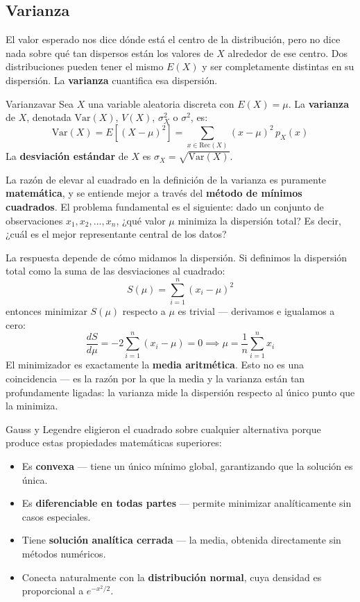 \documentclass[12pt, a4paper]{book}
\numberwithin{equation}{chapter}
\begin{document}
\subsection{Varianza}

El valor esperado nos dice dónde está el centro de la distribución, 
pero no dice nada sobre qué tan dispersos están los valores de $X$ 
alrededor de ese centro. Dos distribuciones pueden tener el mismo 
$E(X)$ y ser completamente distintas en su dispersión. La 
\textbf{varianza} cuantifica esa dispersión.

\begin{definicion}{Varianza}{var}
	Sea $X$ una variable aleatoria discreta con $E(X) = \mu$. La 
	\textbf{varianza} de $X$, denotada $\text{Var}(X)$, $V(X)$, 
	$\sigma^2_X$ o $\sigma^2$, es:
	\[
	\text{Var}(X) = E\!\left[(X - \mu)^2\right] 
	= \sum_{x \in \text{Rec}(X)} (x - \mu)^2\, p_X(x)
	\]
	La \textbf{desviación estándar} de $X$ es $\sigma_X = 
	\sqrt{\text{Var}(X)}$.
\end{definicion}

La razón de elevar al cuadrado en la definición de la varianza es 
puramente \textbf{matemática}, y se entiende mejor a través del 
\textbf{método de mínimos cuadrados}. El problema fundamental es 
el siguiente: dado un conjunto de observaciones $x_1, x_2, \ldots, 
x_n$, ¿qué valor $\mu$ minimiza la dispersión total? Es decir, 
¿cuál es el mejor representante central de los datos?

La respuesta depende de cómo midamos la dispersión. Si definimos 
la dispersión total como la suma de las desviaciones al cuadrado:
\[
S(\mu) = \sum_{i=1}^n (x_i - \mu)^2
\]
entonces minimizar $S(\mu)$ respecto a $\mu$ es trivial — derivamos 
e igualamos a cero:
\[
\frac{dS}{d\mu} = -2\sum_{i=1}^n (x_i - \mu) = 0 
\implies \mu = \frac{1}{n}\sum_{i=1}^n x_i
\]
El minimizador es exactamente la \textbf{media aritmética}. Esto no 
es una coincidencia — es la razón por la que la media y la varianza 
están tan profundamente ligadas: la varianza mide la dispersión 
respecto al único punto que la minimiza.

Gauss y Legendre eligieron el cuadrado sobre cualquier alternativa 
porque produce estas propiedades matemáticas superiores:

\begin{itemize}
	\item Es \textbf{convexa} — tiene un único mínimo global, 
	garantizando que la solución es única.
	\item Es \textbf{diferenciable en todas partes} — permite 
	minimizar analíticamente sin casos especiales.
	\item Tiene \textbf{solución analítica cerrada} — la media, 
	obtenida directamente sin métodos numéricos.
	\item Conecta naturalmente con la \textbf{distribución normal}, 
	cuya densidad es proporcional a $e^{-x^2/2}$.
\end{itemize}
\end{document}
